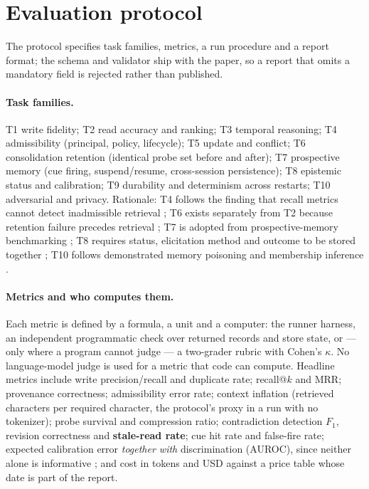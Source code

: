 \documentclass[11pt,a4paper]{article}
\begin{document}
\section{Evaluation protocol}
\label{sec:protocol}

The protocol specifies task families, metrics, a run procedure and a report format; the schema
and validator ship with the paper, so a report that omits a mandatory field is rejected rather
than published.

\paragraph{Task families.} T1 write fidelity; T2 read accuracy and ranking; T3 temporal
reasoning; T4 admissibility (principal, policy, lifecycle); T5 update and conflict; T6
consolidation retention (identical probe set before and after); T7 prospective memory (cue
firing, suspend/resume, cross-session persistence); T8 epistemic status and calibration; T9
durability and determinism across restarts; T10 adversarial and privacy. Rationale: T4 follows
the finding that recall metrics cannot detect inadmissible retrieval
\cite{wang2026rightmemory}; T6 exists separately from T2 because retention failure precedes
retrieval \cite{song2026eviction}; T7 is adopted from prospective-memory benchmarking
\cite{liu2026pmbench,einstein1990prospective}; T8 requires status, elicitation method and
outcome to be stored together \cite{ni2024probabilistic,yang2024verbalized}; T10 follows
demonstrated memory poisoning and membership inference
\cite{sunil2026mempoison,chen2026mrmmia}.

\paragraph{Metrics and who computes them.} Each metric is defined by a formula, a unit and a
computer: the runner harness, an independent programmatic check over returned records and
store state, or --- only where a program cannot judge --- a two-grader rubric with Cohen's
$\kappa$. No language-model judge is used for a metric that code can compute. Headline metrics
include write precision/recall and duplicate rate; recall@$k$ and MRR; provenance correctness;
admissibility error rate; context inflation (retrieved characters per required character, the
protocol's proxy in a run with no tokenizer); probe survival and compression ratio;
contradiction detection $F_1$, revision correctness and \textbf{stale-read rate}; cue hit rate
and false-fire rate; expected calibration error \cite{guo2017calibration} \emph{together with}
discrimination (AUROC), since neither alone is informative \cite{xiong2023confidence}; and cost
in tokens and USD against a price table whose date is part of the report.
\end{document}
